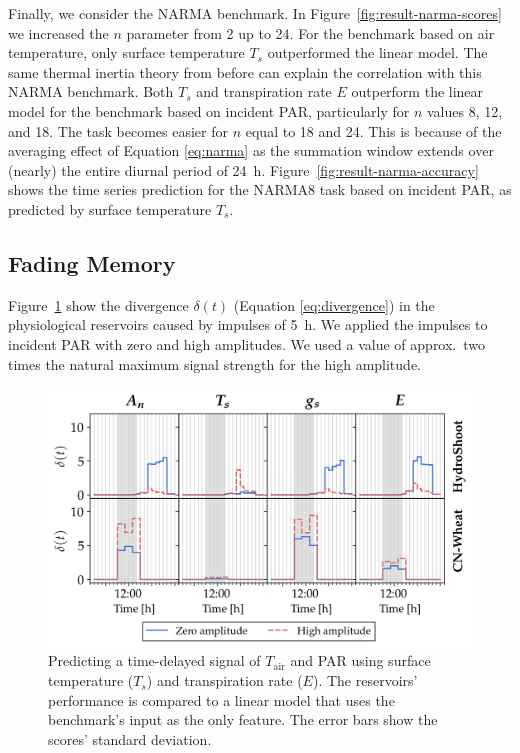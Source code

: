 \documentclass[10pt,a4paper,journal]{IEEEtran}
\begin{document}
Finally, we consider the NARMA benchmark.
In \mbox{Figure \ref{fig:result-narma-scores}} we increased the $n$ parameter from 2 up to 24. 
For the benchmark based on air temperature, only surface temperature $T_s$ outperformed the linear model. 
The same thermal inertia theory from before can explain the correlation with this NARMA benchmark.
Both $T_s$ and transpiration rate $E$ outperform the linear model for the benchmark based on incident PAR, particularly for $n$ values 8, 12, and 18.
The task becomes easier for $n$ equal to 18 and 24.
This is because of the averaging effect of Equation \ref{eq:narma} as the summation window extends over (nearly) the entire diurnal period of \SI{24}{\hour}.
\mbox{Figure \ref{fig:result-narma-accuracy}} shows the time series prediction for the NARMA8 task based on incident PAR, as predicted by surface temperature $T_s$.

\subsection{Fading Memory} \label{sec:results-fading-memory}

\mbox{Figure \ref{fig:results-impulse-experiment}} show the divergence $\delta(t)$ (Equation \ref{eq:divergence}) in the physiological reservoirs caused by impulses of \SI{5}{\hour}. 
We applied the impulses to incident PAR with zero and high amplitudes. 
We used a value of approx.\ two times the natural maximum signal strength for the high amplitude.

\begin{figure}[t]
	\centering
    \includegraphics[width=\linewidth]{imgs/impulse_reservoirs_compact.png}
	\caption{\small 
	Predicting a time-delayed signal of $T_{\text{air}}$ and PAR using surface temperature ($T_s$) and transpiration rate ($E$).
    The reservoirs' performance is compared to a linear model that uses the benchmark's input as the only feature.
    The error bars show the scores' standard deviation.
    }
	\label{fig:results-impulse-experiment}
\end{figure}
\end{document}
